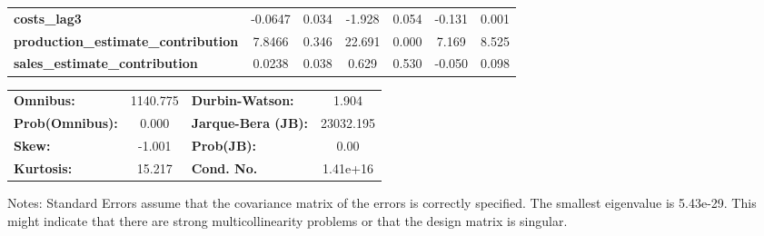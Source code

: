 \begin{center}
\begin{tabular}{lcccccc}
\textbf{costs\_lag3}                        &      -0.0647  &        0.034     &    -1.928  &         0.054        &       -0.131    &        0.001     \\
\textbf{production\_estimate\_contribution} &       7.8466  &        0.346     &    22.691  &         0.000        &        7.169    &        8.525     \\
\textbf{sales\_estimate\_contribution}      &       0.0238  &        0.038     &     0.629  &         0.530        &       -0.050    &        0.098     \\
\bottomrule
\end{tabular}
\begin{tabular}{lclc}
\textbf{Omnibus:}       & 1140.775 & \textbf{  Durbin-Watson:     } &     1.904  \\
\textbf{Prob(Omnibus):} &   0.000  & \textbf{  Jarque-Bera (JB):  } & 23032.195  \\
\textbf{Skew:}          &  -1.001  & \textbf{  Prob(JB):          } &      0.00  \\
\textbf{Kurtosis:}      &  15.217  & \textbf{  Cond. No.          } &  1.41e+16  \\
\bottomrule
\end{tabular}
\end{center}

Notes: \newline
 [1] Standard Errors assume that the covariance matrix of the errors is correctly specified. \newline
 [2] The smallest eigenvalue is 5.43e-29. This might indicate that there are \newline
 strong multicollinearity problems or that the design matrix is singular.